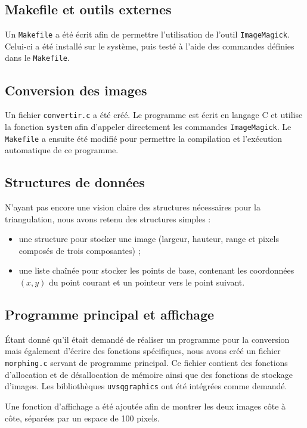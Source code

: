 \documentclass[11pt,a4paper]{article}
\begin{document}
	\subsection{Makefile et outils externes}
	Un \texttt{Makefile} a été écrit afin de permettre l’utilisation de l’outil \texttt{ImageMagick}. Celui-ci a été installé sur le système, puis testé à l’aide des commandes définies dans le \texttt{Makefile}.
	
	\subsection{Conversion des images}
	Un fichier \texttt{convertir.c} a été créé. Le programme est écrit en langage C et utilise la fonction \texttt{system} afin d’appeler directement les commandes \texttt{ImageMagick}.  
	Le \texttt{Makefile} a ensuite été modifié pour permettre la compilation et l’exécution automatique de ce programme.
	
	\subsection{Structures de données}
	N’ayant pas encore une vision claire des structures nécessaires pour la triangulation, nous avons retenu des structures simples :
	\begin{itemize}
		\item une structure pour stocker une image (largeur, hauteur, range et pixels composés de trois composantes) ;
		\item une liste chaînée pour stocker les points de base, contenant les coordonnées $(x,y)$ du point courant et un pointeur vers le point suivant.
	\end{itemize}
	
	\subsection{Programme principal et affichage}
	Étant donné qu’il était demandé de réaliser un programme pour la conversion mais également d’écrire des fonctions spécifiques, nous avons créé un fichier \texttt{morphing.c} servant de programme principal.  
	Ce fichier contient des fonctions d’allocation et de désallocation de mémoire ainsi que des fonctions de stockage d’images. Les bibliothèques \texttt{uvsqgraphics} ont été intégrées comme demandé.
	
	Une fonction d’affichage a été ajoutée afin de montrer les deux images côte à côte, séparées par un espace de 100 pixels.
	
\end{document}
